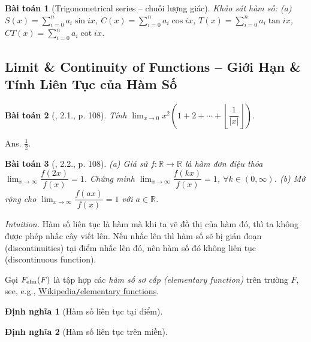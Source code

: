 \documentclass{article}
\newtheorem{baitoan}{Bài toán}
\newtheorem{dinhnghia}{Định nghĩa}
\begin{document}
\begin{baitoan}[Trigonometrical series -- chuỗi lượng giác]
	Khảo sát hàm số: (a) $S(x) = \sum_{i=0}^n a_i\sin ix$, $C(x) = \sum_{i=0}^n a_i\cos ix$, $T(x) = \sum_{i=0}^n a_i\tan ix$, $CT(x) = \sum_{i=0}^n a_i\cot ix$.
\end{baitoan}



\subsection{Limit \& Continuity of Functions -- Giới Hạn \& Tính Liên Tục của Hàm Số}

\begin{baitoan}[\cite{Quoc_Long_Dat_Nam_VMC}, 2.1., p. 108]
	Tính $\lim_{x\to0} x^2\left(1 + 2 + \cdots + \left\lfloor\dfrac{1}{|x|}\right\rfloor\right)$.
\end{baitoan}
{\sf Ans.} $\frac{1}{2}$.

\begin{baitoan}[\cite{Quoc_Long_Dat_Nam_VMC}, 2.2., p. 108]
	(a) Giả sử $f:\mathbb{R}\to\mathbb{R}$ là hàm đơn điệu thỏa $\lim_{x\to\infty} \dfrac{f(2x)}{f(x)} = 1$. Chứng minh $\lim_{x\to\infty} \dfrac{f(kx)}{f(x)} = 1$, $\forall k\in(0,\infty)$. (b) Mở rộng cho $\lim_{x\to\infty} \dfrac{f(ax)}{f(x)} = 1$ với $a\in\mathbb{R}$.
\end{baitoan}
{\it Intuition.} Hàm số liên tục là hàm mà khi ta vẽ đồ thị của hàm đó, thì ta không được phép nhấc cây viết lên. Nếu nhấc lên thì hàm số sẽ bị gián đoạn (discontinuities) tại điểm nhấc lên đó, nên hàm số đó không liên tục (discontinuous function).

Gọi $F_{\rm elm}(F)$ là tập hợp các {\it hàm số sơ cấp (elementary function)} trên trường $F$, see, e.g., \href{https://en.wikipedia.org/wiki/Elementary_function}{Wikipedia{\tt/}elementary functions}.

\begin{dinhnghia}[Hàm số liên tục tại điểm]
	
\end{dinhnghia}

\begin{dinhnghia}[Hàm số liên tục trên miền]
	
\end{dinhnghia}
\end{document}
